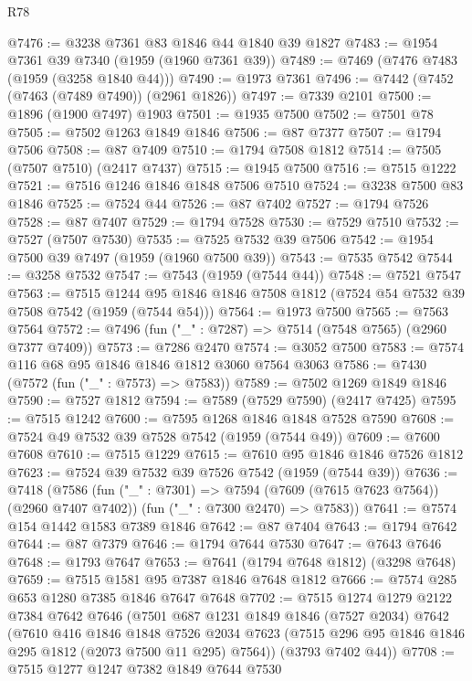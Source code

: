 \begin{lexlean}{R78}
\begin{coremodule}
@7476 := @3238 @7361 @83 @1846 @44 @1840 @39 @1827
@7483 := @1954 @7361 @39 @7340 (@1959 (@1960 @7361 @39))
@7489 := @7469 (@7476 @7483 (@1959 (@3258 @1840 @44)))
@7490 := @1973 @7361
@7496 := @7442 (@7452 (@7463 (@7489 @7490)) (@2961 @1826))
@7497 := @7339 @2101
@7500 := @1896 (@1900 @7497) @1903
@7501 := @1935 @7500
@7502 := @7501 @78
@7505 := @7502 @1263 @1849 @1846
@7506 := @87 @7377
@7507 := @1794 @7506
@7508 := @87 @7409
@7510 := @1794 @7508 @1812
@7514 := @7505 (@7507 @7510) (@2417 @7437)
@7515 := @1945 @7500
@7516 := @7515 @1222
@7521 := @7516 @1246 @1846 @1848 @7506 @7510
@7524 := @3238 @7500 @83 @1846
@7525 := @7524 @44
@7526 := @87 @7402
@7527 := @1794 @7526
@7528 := @87 @7407
@7529 := @1794 @7528
@7530 := @7529 @7510
@7532 := @7527 (@7507 @7530)
@7535 := @7525 @7532 @39 @7506
@7542 := @1954 @7500 @39 @7497 (@1959 (@1960 @7500 @39))
@7543 := @7535 @7542
@7544 := @3258 @7532
@7547 := @7543 (@1959 (@7544 @44))
@7548 := @7521 @7547
@7563 := @7515
    @1244
    @95
    @1846
    @1846
    @7508
    @1812
    (@7524 @54 @7532 @39 @7508 @7542 (@1959 (@7544 @54)))
@7564 := @1973 @7500
@7565 := @7563 @7564
@7572 := @7496 (fun ("_" : @7287) => @7514 (@7548 @7565) (@2960 @7377 @7409))
@7573 := @7286 @2470
@7574 := @3052 @7500
@7583 := @7574 @116 @68 @95 @1846 @1846 @1812 @3060 @7564 @3063
@7586 := @7430 (@7572 (fun ("_" : @7573) => @7583))
@7589 := @7502 @1269 @1849 @1846
@7590 := @7527 @1812
@7594 := @7589 (@7529 @7590) (@2417 @7425)
@7595 := @7515 @1242
@7600 := @7595 @1268 @1846 @1848 @7528 @7590
@7608 := @7524 @49 @7532 @39 @7528 @7542 (@1959 (@7544 @49))
@7609 := @7600 @7608
@7610 := @7515 @1229
@7615 := @7610 @95 @1846 @1846 @7526 @1812
@7623 := @7524 @39 @7532 @39 @7526 @7542 (@1959 (@7544 @39))
@7636 := @7418
    (@7586
      (fun ("_" : @7301) => @7594 (@7609 (@7615 @7623 @7564)) (@2960 @7407 @7402))
      (fun ("_" : @7300 @2470) => @7583))
@7641 := @7574 @154 @1442 @1583 @7389 @1846
@7642 := @87 @7404
@7643 := @1794 @7642
@7644 := @87 @7379
@7646 := @1794 @7644 @7530
@7647 := @7643 @7646
@7648 := @1793 @7647
@7653 := @7641 (@1794 @7648 @1812) (@3298 @7648)
@7659 := @7515 @1581 @95 @7387 @1846 @7648 @1812
@7666 := @7574 @285 @653 @1280 @7385 @1846 @7647 @7648
@7702 := @7515
    @1274
    @1279
    @2122
    @7384
    @7642
    @7646
    (@7501
      @687
      @1231
      @1849
      @1846
      (@7527 @2034)
      @7642
      (@7610
        @416
        @1846
        @1848
        @7526
        @2034
        @7623
        (@7515 @296 @95 @1846 @1846 @295 @1812 (@2073 @7500 @11 @295) @7564))
      (@3793 @7402 @44))
@7708 := @7515 @1277 @1247 @7382 @1849 @7644 @7530

\end{coremodule}
\end{lexlean}
